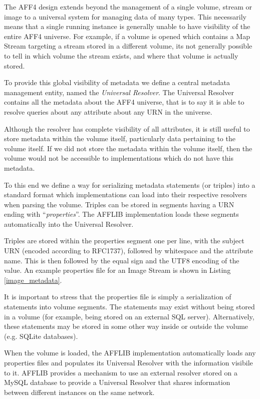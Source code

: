 \documentclass[10pt, conference]{IEEEtran}
\begin{document}
The AFF4 design extends beyond the management of a single volume,
stream or image to a universal system for managing data of many
types. This necessarily means that a single running instance is
generally unable to have visibility of the entire AFF4 universe. For
example, if a volume is opened which contains a Map Stream targeting a
stream stored in a different volume, its not generally possible to
tell in which volume the stream exists, and where that volume is
actually stored.

To provide this global visibility of metadata we define a central
metadata management entity, named the {\em Universal Resolver}. The
Universal Resolver contains all the metadata about the AFF4 universe,
that is to say it is able to resolve queries about any attribute about
any URN in the universe.

Although the resolver has complete visibility of all attributes, it is
still useful to store metadata within the volume itself, particularly
data pertaining to the volume itself. If we did not store the metadata
within the volume itself, then the volume would not be accessible to
implementations which do not have this metadata.

To this end we define a way for serializing metadata statements (or
triples) into a standard format which implementations can load into
their respective resolvers when parsing the volume. Triples can be
stored in segments having a URN ending with ``{\em properties}''. The
AFFLIB implementation loads these segments automatically into the
Universal Resolver. 

Triples are stored within the properties segment one per line, with
the subject URN (encoded according to RFC1737), followed by whitespace
and the attribute name. This is then followed by the equal sign and
the UTF8 encoding of the value. An example properties file for an
Image Stream is shown in Listing \ref{image_metadata}.

It is important to stress that the properties file is simply a
serialization of statements into volume segments. The statements may
exist without being stored in a volume (for example, being stored on
an external SQL server). Alternatively, these statements may be stored
in some other way inside or outside the volume (e.g. SQLite
databases).

When the volume is loaded, the AFFLIB implementation automatically
loads any properties files and populates its Universal Resolver with
the information visibile to it. AFFLIB provides a mechanism to use an
external resolver stored on a MySQL database to provide a Universal
Resolver that shares information between different instances on the
same network.
\end{document}
